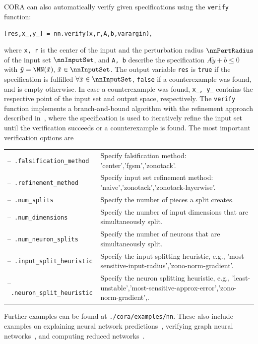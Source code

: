 \begin{center}
    \begin{minipage}[t]{0.9\textwidth}
    {\footnotesize  }
    \end{minipage}
\end{center}

CORA can also automatically verify given specifications using the \texttt{verify} function:

\begin{center}
    \texttt{[res,x\_,y\_] = nn.verify(x,r,A,b,varargin)},
\end{center}

where \texttt{x, r} is the center of the input and the perturbation radius $\nnPertRadius$ of the input set $\nnInputSet$,
and \texttt{A, b} describe the specification $A\tilde{y}+b\leq0$ with $\tilde{y}=\NN(\tilde{x}),\,\tilde{x}\in\nnInputSet$.
The output variable \texttt{res} is \texttt{true} if the specification is fulfilled $\forall \tilde{x}\in\nnInputSet$,
\texttt{false} if a counterexample was found, and is empty otherwise.
In case a counterexample was found, \texttt{x\_, y\_} contains the respective point of the input set and output space, respectively.
The \texttt{verify} function implements a branch-and-bound algorithm with the refinement approach described in~\cite{koller2025a}, where the specification is used to iteratively refine the input set until the verification succeeds or a counterexample is found. 
The most important verification options are
\begin{center}
    \renewcommand{\arraystretch}{1.3}
    \begin{longtable}[t]{l p{11cm}}
        --~\texttt{.falsification\_method} & Specify falsification method: {'center','fgsm','zonotack'}. \\
        --~\texttt{.refinement\_method} & Specify input set refinement method: {'naive','zonotack','zonotack-layerwise'}. \\
        --~\texttt{.num\_splits} & Specify the number of pieces a split creates. \\
        --~\texttt{.num\_dimensions} & Specify the number of input dimensions that are simultaneously split. \\
        --~\texttt{.num\_neuron\_splits} & Specify the number of neurons that are simultaneously split. \\
        --~\texttt{.input\_split\_heuristic} & Specify the input splitting heuristic, e.g., {'most-sensitive-input-radius','zono-norm-gradient'}. \\
        --~\texttt{.neuron\_split\_heuristic} & Specify the neuron splitting heuristic, e.g., {'least-unstable','most-sensitive-approx-error','zono-norm-gradient',}.
    \end{longtable}
\end{center}

Further examples can be found at \texttt{./cora/examples/nn}.
These also include examples on
explaining neural network predictions~\cite{ladner2025xai},
verifying graph neural networks~\cite{ladner2025gnn},
and computing reduced networks~\cite{ladner2025reduction}.
